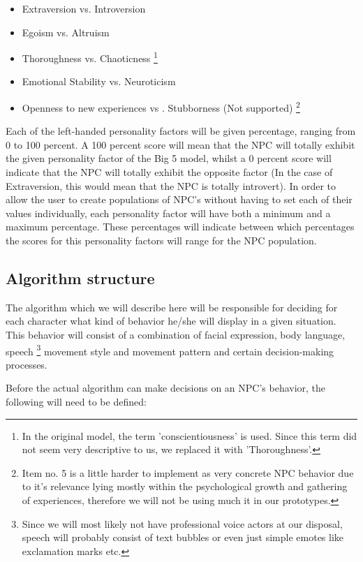 \documentclass{article}
\begin{document}
   \begin{itemize}
   	\item Extraversion vs. Introversion
   	\item Egoism vs. Altruism
   	\item Thoroughness vs. Chaoticness \footnote{In the original model, the term 'conscientiousness' is used. Since this term did not seem very descriptive to us, we replaced it with 'Thoroughness'.}
   	\item Emotional Stability vs. Neuroticism 
   	\item Openness to new experiences vs . Stubborness (Not supported) \footnote{Item no. 5 is a little harder to implement as very concrete NPC behavior due to it's relevance lying mostly within the psychological growth and gathering of experiences, therefore we will not be using much it in our prototypes.}
   \end{itemize}

    Each of the left-handed personality factors will be given percentage, ranging from 0 to 100 percent. A 100 percent score will mean that the NPC will totally exhibit the given personality factor of the Big 5 model, whilst a 0 percent score will indicate that the NPC will totally exhibit the opposite factor (In the case of Extraversion, this would mean that the NPC is totally introvert). In order to allow the user to create populations of NPC's without having to set each of their values individually, each personality factor will have both a minimum and a maximum percentage. These percentages will indicate between which percentages the scores for this personality factors will range for the NPC population. 

   \newpage
   \subsection{Algorithm structure}
    The algorithm which we will describe here will be responsible for deciding for each character what kind of behavior he/she will display in a given situation. This behavior will consist of a combination of facial expression, body language, speech \footnote{Since we will most likely not have professional voice actors at our disposal, speech will probably consist of text bubbles or even just simple emotes like exclamation marks etc.} movement style and movement pattern and certain decision-making processes. 

    Before the actual algorithm can make decisions on an NPC's behavior, the following will need to be defined:
\end{document}
